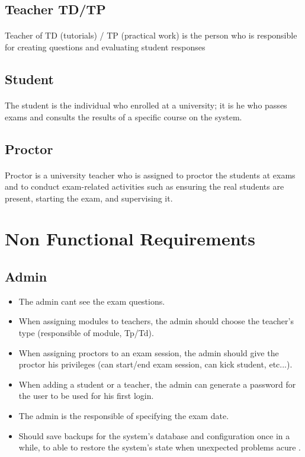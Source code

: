 \documentclass[]{uc2pfecaneva}
\begin{document}
\raggedright\subsection{Teacher TD/TP}
\paragraph{}
	Teacher of TD (tutorials) / TP (practical work) is the person who is responsible for creating questions and evaluating student responses


\raggedright\subsection{Student}
\paragraph{}
	The student is the individual who enrolled at a university; it is he who passes exams and consults the results of a specific course on the system.

\raggedright\subsection{Proctor}
\paragraph{}
	Proctor is a university teacher who is assigned to proctor the students at exams and to conduct exam-related activities such as ensuring the real students are present, starting the exam, and supervising it.

\raggedright\section{Non Functional Requirements}
\raggedright\subsection{Admin}
\begin{itemize}
\item The admin cant see the exam questions.
\item When assigning modules to teachers, the admin should choose the teacher’s type (responsible of module, Tp/Td).
\item When assigning proctors to an exam session, the admin should give the proctor his privileges (can start/end exam session, can kick student, etc...).
\item When adding a student or a teacher, the admin can generate a password for the user to be used for his first login.
\item The admin is the responsible of specifying the exam date.
\item Should save backups for the system’s database and configuration once in a while, to able to restore the system’s state when  unexpected problems acure .

\end{itemize}
\end{document}

